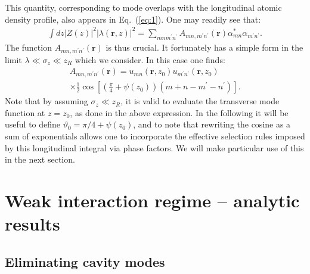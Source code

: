 \documentclass[pra,twocolumn,superscriptaddress]{revtex4-1}
\newcommand{\vect}[1]{\mathbf{#1}}
\newcommand{\light}{\lambda}
\newcommand{\transverse}{u}
\begin{document}
This quantity, corresponding to mode overlaps with the longitudinal
atomic density profile, also appears in Eq.~(\ref{eq:1}).  One may
readily see that:
\begin{multline}
  \label{eq:2}
  \int dz |Z(z)|^2 |\light(\vect{r},z)|^2
  = \!\!\!\!\sum_{mnm^\prime n^\prime}\!\!\!
  A_{mn,m^\prime n^\prime}(\vect r)
  \alpha_{mn}^\ast
  \alpha_{m^\prime n^\prime}.
\end{multline}
The function $A_{mn,m^\prime n^\prime}(\vect r)$ is thus crucial.  It
fortunately has a simple form in the limit $ \lambda \ll \sigma_z \ll
z_R$ which we consider. In this case one finds:
\begin{multline}
  \label{eq:4}
  A_{mn,m^\prime n^\prime}(\vect r)
  = \transverse_{mn}(\vect r,z_0)\transverse_{m^\prime n^\prime}(\vect r,z_0)
  \\
  \times
  \frac{1}{2} \cos\left[\left(\frac{\pi}{4} + \psi(z_0)\right)
    (m+n-m^\prime-n^\prime)
  \right].
\end{multline}
Note that by assuming $\sigma_z \ll z_R$, it is valid to evaluate the
transverse mode function at $z=z_0$, as done in the above expression.
In the following it will be useful to define $\vartheta_0 = \pi/4 +
\psi(z_0)$, and to note that rewriting the cosine as a sum of
exponentials allows one to incorporate the effective selection rules
imposed by this longitudinal integral via phase factors.  We will make
particular use of this in the next section.

\section{Weak interaction regime -- analytic results}
\label{sec:weak-inter-regime}

\subsection{Eliminating cavity modes}
\label{sec:elim-cavity-modes}
\end{document}
